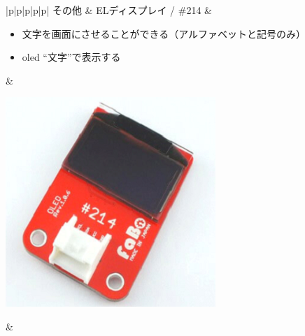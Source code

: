 \begin{table}[H]
{\begin{tabular}{|p{\colA}|p{\colB}|p{\colC}|p{\colD}|p{\colE}|}
			その他 & ELディスプレイ / \#214 & 
			\begin{minipage}[t]{\linewidth}
				\begin{itemize}
					\item 文字を画面にさせることができる（アルファベットと記号のみ）
					\item oled “文字”で表示する
				\end{itemize}
				\smallskip
			\end{minipage} & 
			\begin{minipage}[t]{\linewidth}
				\smallskip
				\centering
				\includegraphics[width=0.8\linewidth]{images/chap05/text05-img025.png}
				\smallskip
			\end{minipage} &
			\pageref{oled}\\ \hline
		\end{tabular}
	}
\end{table}
